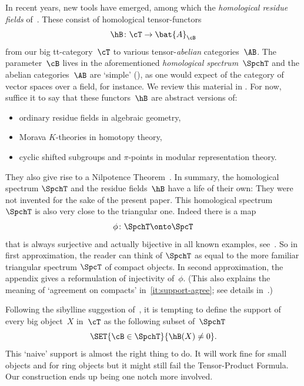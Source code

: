 In recent years, new tools have emerged, among which the \emph{homological residue fields} of~\cite{BalmerKrauseStevenson19,Balmer20a}. These consist of homological tensor-functors
\begin{equation}
\label{eq:hB-intro}
\hB\colon \cT\to \bat{A}_{\cB}
\end{equation}
from our big tt-category~$\cT$ to various tensor-\emph{abelian} categories~$\AB$. The parameter~$\cB$ lives in the aforementioned \emph{homological spectrum}~$\SpchT$ and the abelian categories~$\AB$ are `simple' (), as one would expect of the category of vector spaces over a field, for instance. We review this material in . For now, suffice it to say that these functors~$\hB$ are abstract versions of:
\begin{itemize}
\item[--] ordinary residue fields in algebraic geometry,
\item[--] Morava $K$-theories in homotopy theory,
\item[--] cyclic shifted subgroups and $\pi$-points in modular representation theory.
\end{itemize}

They also give rise to a Nilpotence Theorem~\cite[Th.\,1.1]{Balmer20a}. In summary, the homological spectrum $\SpchT$ and the residue fields~$\hB$ have a life of their own: They were not invented for the sake of the present paper. This homological spectrum~$\SpchT$ is also very close to the triangular one. Indeed there is a map
\begin{equation}
\label{eq:phi}
\phi\colon\SpchT\onto \SpcT
\end{equation}
that is always surjective and actually bijective in all known examples, see~\hbox{\cite[\S5]{Balmer20a}}. So in first approximation, the reader can think of $\SpchT$ as equal to the more familiar triangular spectrum $\SpcT$ of compact objects. In second approximation, the appendix gives a reformulation of injectivity of~$\phi$. (This also explains the meaning of `agreement on compacts' in \,\eqref{it:support-agree}; see details in~.)

Following the sibylline suggestion of~\cite[Rem.\,4.6]{Balmer20a}, it is tempting to define the support of every big object~$X$ in~$\cT$ as the following subset of~$\SpchT$
\begin{equation}
\label{eq:naive-support}
\SET{\cB\in\SpchT}{\hB(X)\neq 0}.
\end{equation}
This `naive' support is almost the right thing to do. It will work fine for small objects and for ring objects but it might still fail the Tensor-Product Formula. Our construction ends up being one notch more involved.

